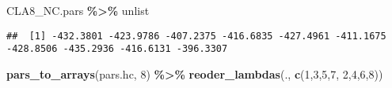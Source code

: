 \documentclass[
]{article}
\newenvironment{Shaded}{\begin{snugshade}}{\end{snugshade}}
\newcommand{\DecValTok}[1]{\textcolor[rgb]{0.00,0.00,0.81}{#1}}
\newcommand{\FunctionTok}[1]{\textcolor[rgb]{0.13,0.29,0.53}{\textbf{#1}}}
\newcommand{\NormalTok}[1]{#1}
\newcommand{\SpecialCharTok}[1]{\textcolor[rgb]{0.81,0.36,0.00}{\textbf{#1}}}
\begin{document}
\begin{Shaded}
\begin{Highlighting}[]
\NormalTok{CLA8\_NC.pars }\SpecialCharTok{\%\textgreater{}\%}\NormalTok{ unlist}
\end{Highlighting}
\end{Shaded}

\begin{verbatim}
##  [1] -432.3801 -423.9786 -407.2375 -416.6835 -427.4961 -411.1675 -428.8506 -435.2936 -416.6131 -396.3307
\end{verbatim}

\begin{Shaded}
\begin{Highlighting}[]
\FunctionTok{pars\_to\_arrays}\NormalTok{(pars.hc, }\DecValTok{8}\NormalTok{) }\SpecialCharTok{\%\textgreater{}\%} \FunctionTok{reoder\_lambdas}\NormalTok{(., }\FunctionTok{c}\NormalTok{(}\DecValTok{1}\NormalTok{,}\DecValTok{3}\NormalTok{,}\DecValTok{5}\NormalTok{,}\DecValTok{7}\NormalTok{, }\DecValTok{2}\NormalTok{,}\DecValTok{4}\NormalTok{,}\DecValTok{6}\NormalTok{,}\DecValTok{8}\NormalTok{))}
\end{Highlighting}
\end{Shaded}
\end{document}
